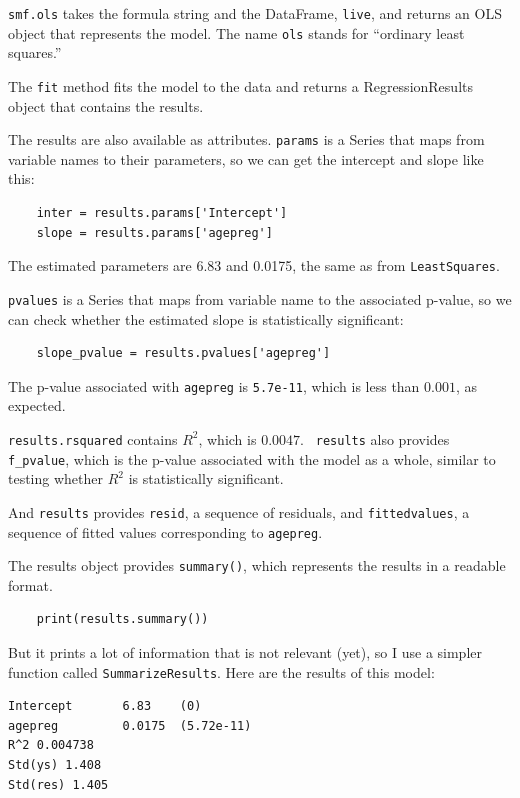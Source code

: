 \documentclass[12pt]{book}
\begin{document}
{\tt smf.ols} takes the formula string and the DataFrame, {\tt live},
and returns an OLS object that represents the model.  The name {\tt ols}
stands for ``ordinary least squares.''

The {\tt fit} method fits the model to the data and returns a
RegressionResults object that contains the results.

The results are also available as attributes.  {\tt params}
is a Series that maps from variable names to their parameters, so we can
get the intercept and slope like this:

\begin{verbatim}
    inter = results.params['Intercept']
    slope = results.params['agepreg']
\end{verbatim}

The estimated parameters are 6.83 and 0.0175, the same as
from {\tt LeastSquares}.

{\tt pvalues} is a Series that maps from variable name to the associated
p-value, so we can check whether the estimated slope is statistically
significant:

\begin{verbatim}
    slope_pvalue = results.pvalues['agepreg']
\end{verbatim}

The p-value associated with {\tt agepreg} is {\tt 5.7e-11}, which
is less than $0.001$, as expected.

{\tt results.rsquared} contains $R^2$, which is $0.0047$.  {\tt
  results} also provides \verb"f_pvalue", which is the p-value
associated with the model as a whole, similar to testing whether $R^2$
is statistically significant.

And {\tt results} provides {\tt resid}, a sequence of residuals, and
{\tt fittedvalues}, a sequence of fitted values corresponding to
{\tt agepreg}.

The results object provides {\tt summary()}, which
represents the results in a readable format.  

\begin{verbatim}
    print(results.summary())
\end{verbatim}

But it prints a lot of information that is not relevant (yet), so
I use a simpler function called {\tt SummarizeResults}.  Here are
the results of this model:

\begin{verbatim}
Intercept       6.83    (0)
agepreg         0.0175  (5.72e-11)
R^2 0.004738
Std(ys) 1.408
Std(res) 1.405
\end{verbatim}
\end{document}
